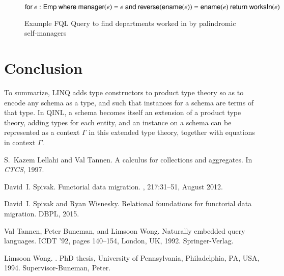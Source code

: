 \documentclass[11pt]{article}
\theoremstyle{remark}
\theoremstyle{definition}
\begin{document}
\begin{figure}[h]
\caption{Example FQL Query to find departments worked in by palindromic self-managers}
$$
{\sf for} \ e: {\sf Emp }\ {\sf where} \ {\sf manager}(e)=e \ {\sf and} \ {\sf reverse}({\sf ename}(e)) = {\sf ename}(e) \ {\sf return} \ {\sf worksIn}(e)
$$
\end{figure}
\newpage

\section{Conclusion}

To summarize, LINQ adds type constructors to product type theory so as to encode any schema as a type, and such that instances for a schema are terms of that type. In QINL, a schema becomes itself an extension of a product type theory, adding types for each entity, and an instance on a schema can be represented as a context $\Gamma$ in this extended type theory, together with equations in context $\Gamma$.

















\begin{thebibliography}{1}

S.~Kazem Lellahi and Val Tannen.
\newblock A calculus for collections and aggregates.
\newblock In {\em CTCS}, 1997.

David~I. Spivak.
\newblock Functorial data migration.
, 217:31--51, August 2012.

David~I. Spivak and Ryan Wisnesky.
\newblock Relational foundations for functorial data migration.
\newblock DBPL, 2015.

Val Tannen, Peter Buneman, and Limsoon Wong.
\newblock Naturally embedded query languages.
\newblock ICDT '92, pages 140--154, London, UK, 1992. Springer-Verlag.

Limsoon Wong.
.
\newblock PhD thesis, University of Pennsylvania, Philadelphia, PA, USA, 1994.
\newblock Supervisor-Buneman, Peter.

\end{thebibliography}
\end{document}
